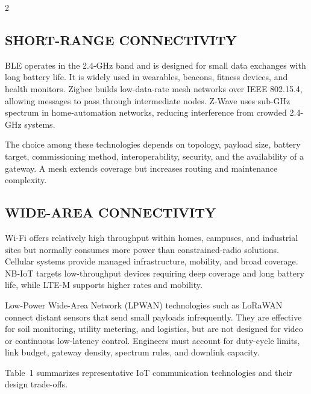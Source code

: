 \begin{multicols}{2}
  \subsection*{\centering\uppercase{Short-Range Connectivity}}
  BLE operates in the 2.4-GHz band and is designed for small data exchanges with long battery life. It is widely used in wearables, beacons, fitness devices, and health monitors. Zigbee builds low-data-rate mesh networks over IEEE 802.15.4, allowing messages to pass through intermediate nodes. Z-Wave uses sub-GHz spectrum in home-automation networks, reducing interference from crowded 2.4-GHz systems.

  \noindent
  The choice among these technologies depends on topology, payload size, battery target, commissioning method, interoperability, security, and the availability of a gateway. A mesh extends coverage but increases routing and maintenance complexity.

  \subsection*{\centering\uppercase{Wide-Area Connectivity}}
  Wi-Fi offers relatively high throughput within homes, campuses, and industrial sites but normally consumes more power than constrained-radio solutions. Cellular systems provide managed infrastructure, mobility, and broad coverage. NB-IoT targets low-throughput devices requiring deep coverage and long battery life, while LTE-M supports higher rates and mobility.

  \noindent
  Low-Power Wide-Area Network (LPWAN) technologies such as LoRaWAN connect distant sensors that send small payloads infrequently. They are effective for soil monitoring, utility metering, and logistics, but are not designed for video or continuous low-latency control. Engineers must account for duty-cycle limits, link budget, gateway density, spectrum rules, and downlink capacity.

  \noindent
  Table~1 summarizes representative IoT communication technologies and their design trade-offs.
\end{multicols}

